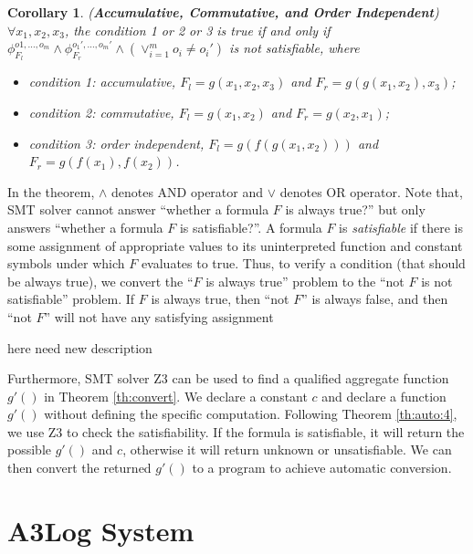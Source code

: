 \documentclass{vldb}
\begin{document}
\newtheorem{corollary}{Corollary}
\begin{corollary}
	\label{coro:auto:1}
	(\textbf{Accumulative, Commutative, and Order Independent}) $\forall x_1,x_2,x_3$, the condition 1 or 2 or 3 is true if and only if $\phi_{F_l}^{o1,\ldots,o_m}\wedge \phi_{F_r}^{o_1',\ldots,o_m'}\wedge (\vee_{i=1}^m{o_i\neq o_i'})$ is not satisfiable, where
	\begin{itemize}
		\item condition 1: accumulative, $F_l=g(x_1,x_2,x_3)$ and $F_r=g(g(x_1,x_2),x_3)$;
		\item condition 2: commutative, $F_l=g(x_1,x_2)$ and $F_r=g(x_2,x_1)$;
		\item condition 3: order independent, $F_l=g(f(g(x_1,x_2)))$ and $F_r=g(f(x_1),f(x_2))$.
	\end{itemize}
\end{corollary}

In the theorem, $\wedge$ denotes AND operator and $\vee$ denotes OR operator. Note that, SMT solver cannot answer ``whether a formula $F$ is always true?'' but only answers ``whether a formula $F$ is satisfiable?''. A formula $F$ is \emph{satisfiable} if there is some assignment of appropriate values to its uninterpreted function and constant symbols under which $F$ evaluates to true. Thus, to verify a condition (that should be always true), we convert the ``$F$ is always true'' problem to the ``not $F$ is not satisfiable'' problem. If $F$ is always true, then ``not $F$'' is always false, and then ``not $F$'' will not have any satisfying assignment

here need new description


Furthermore, SMT solver Z3 can be used to find a qualified aggregate function $g'()$ in Theorem \ref{th:convert}. We declare a constant $c$ and declare a function $g'()$ without defining the specific computation. Following Theorem \ref{th:auto:4}, we use Z3 to check the satisfiability. If the formula is satisfiable, it will return the possible $g'()$ and $c$, otherwise it will return unknown or unsatisfiable. We can then convert the returned $g'()$ to a program to achieve automatic conversion.







\section{A3Log System}
\label{sec:system}
\end{document}
